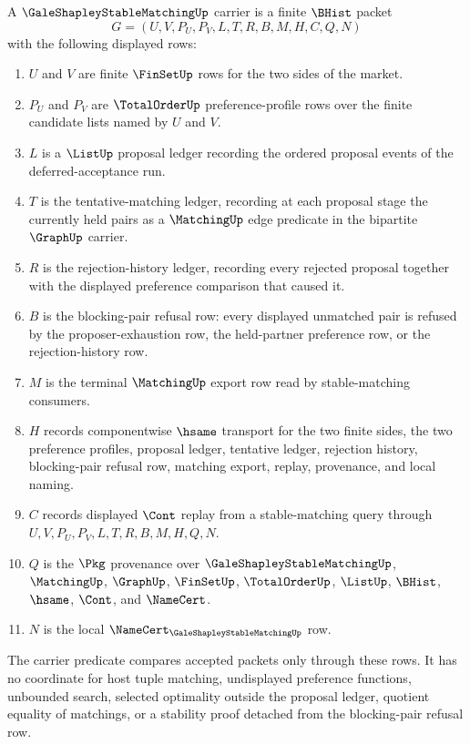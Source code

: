 \begin{definition}
\label{def:gale-shapley-stable-matching-carrier}
A $\GaleShapleyStableMatchingUp$ carrier is a finite $\BHist$ packet
$$
G=(U,V,P_U,P_V,L,T,R,B,M,H,C,Q,N)
$$
with the following displayed rows:
\begin{enumerate}
\item $U$ and $V$ are finite $\FinSetUp$ rows for the two sides of the market.
\item $P_U$ and $P_V$ are $\TotalOrderUp$ preference-profile rows over the finite candidate lists named by $U$ and $V$.
\item $L$ is a $\ListUp$ proposal ledger recording the ordered proposal events of the deferred-acceptance run.
\item $T$ is the tentative-matching ledger, recording at each proposal stage the currently held pairs as a $\MatchingUp$ edge predicate in the bipartite $\GraphUp$ carrier.
\item $R$ is the rejection-history ledger, recording every rejected proposal together with the displayed preference comparison that caused it.
\item $B$ is the blocking-pair refusal row: every displayed unmatched pair is refused by the proposer-exhaustion row, the held-partner preference row, or the rejection-history row.
\item $M$ is the terminal $\MatchingUp$ export row read by stable-matching consumers.
\item $H$ records componentwise $\hsame$ transport for the two finite sides, the two preference profiles, proposal ledger, tentative ledger, rejection history, blocking-pair refusal row, matching export, replay, provenance, and local naming.
\item $C$ records displayed $\Cont$ replay from a stable-matching query through $U,V,P_U,P_V,L,T,R,B,M,H,Q,N$.
\item $Q$ is the $\Pkg$ provenance over $\GaleShapleyStableMatchingUp$, $\MatchingUp$, $\GraphUp$, $\FinSetUp$, $\TotalOrderUp$, $\ListUp$, $\BHist$, $\hsame$, $\Cont$, and $\NameCert$.
\item $N$ is the local $\NameCert_{\GaleShapleyStableMatchingUp}$ row.
\end{enumerate}
The carrier predicate compares accepted packets only through these rows. It has no coordinate for host tuple matching, undisplayed preference functions, unbounded search, selected optimality outside the proposal ledger, quotient equality of matchings, or a stability proof detached from the blocking-pair refusal row.
\end{definition}

